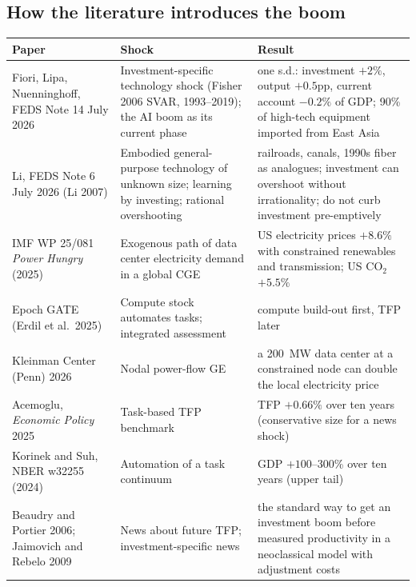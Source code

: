 \documentclass[11pt]{article}
\begin{document}
\subsection{How the literature introduces the boom}
\begin{center}\footnotesize
\begin{tabular}{p{3.6cm}p{4.2cm}p{6.4cm}}
\toprule
Paper & Shock & Result \\
\midrule
Fiori, Lipa, Nuenninghoff, FEDS Note 14 July 2026 & Investment-specific technology shock (Fisher 2006 SVAR, 1993--2019); the AI boom as its current phase & one s.d.: investment $+2\%$, output $+0.5$pp, current account $-0.2\%$ of GDP; 90\% of high-tech equipment imported from East Asia \\
Li, FEDS Note 6 July 2026 (Li 2007) & Embodied general-purpose technology of unknown size; learning by investing; rational overshooting & railroads, canals, 1990s fiber as analogues; investment can overshoot without irrationality; do not curb investment pre-emptively \\
IMF WP 25/081 \emph{Power Hungry} (2025) & Exogenous path of data center electricity demand in a global CGE & US electricity prices $+8.6\%$ with constrained renewables and transmission; US CO$_2$ $+5.5\%$ \\
Epoch GATE (Erdil et al.\ 2025) & Compute stock automates tasks; integrated assessment & compute build-out first, TFP later \\
Kleinman Center (Penn) 2026 & Nodal power-flow GE & a 200~MW data center at a constrained node can double the local electricity price \\
Acemoglu, \emph{Economic Policy} 2025 & Task-based TFP benchmark & TFP $+0.66\%$ over ten years (conservative size for a news shock) \\
Korinek and Suh, NBER w32255 (2024) & Automation of a task continuum & GDP $+100$--300\% over ten years (upper tail) \\
Beaudry and Portier 2006; Jaimovich and Rebelo 2009 & News about future TFP; investment-specific news & the standard way to get an investment boom before measured productivity in a neoclassical model with adjustment costs \\
\bottomrule
\end{tabular}
\end{center}
\end{document}
